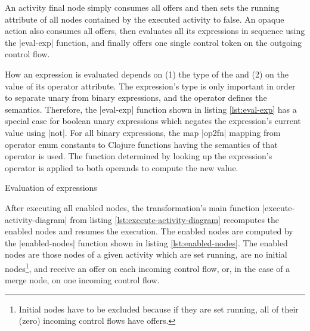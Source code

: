\documentclass[submission]{eptcs}
\newcommand{\code}{\clojureinline}
\begin{document}
An activity final node simply consumes all offers and then sets the
\textsf{running} attribute of all nodes contained by the executed activity to
false.  An opaque action also consumes all offers, then evaluates all its
expressions in sequence using the \code|eval-exp| function, and finally offers
one single control token on the outgoing control flow.

How an expression is evaluated depends on (1) the type of the and (2) on the
value of its \textsf{operator} attribute.  The expression's type is only
important in order to separate unary from binary expressions, and the operator
defines the semantics.  Therefore, the \code|eval-exp| function shown in
listing \vref{lst:eval-exp} has a special case for boolean unary expressions
which negates the expression's current value using \code|not|.  For all binary
expressions, the map \code|op2fn| mapping from operator enum constants to
Clojure functions having the semantics of that operator is used.  The function
determined by looking up the expression's operator is applied to both operands
to compute the new value.

\begin{listing}[h!tb]
\caption{Evaluation of expressions}
\label{lst:eval-exp}
\end{listing}

After executing all enabled nodes, the transformation's main function
\code|execute-activity-diagram| from listing
\vref{lst:execute-activity-diagram} recomputes the enabled nodes and resumes
the execution.  The enabled nodes are computed by the \code|enabled-nodes|
function shown in listing \vref{lst:enabled-nodes}.  The enabled nodes are
those nodes of a given activity which are set running, are no initial
nodes\footnote{Initial nodes have to be excluded because if they are set
  running, all of their (zero) incoming control flows have offers.}, and
receive an offer on each incoming control flow, or, in the case of a merge
node, on one incoming control flow.
\end{document}
